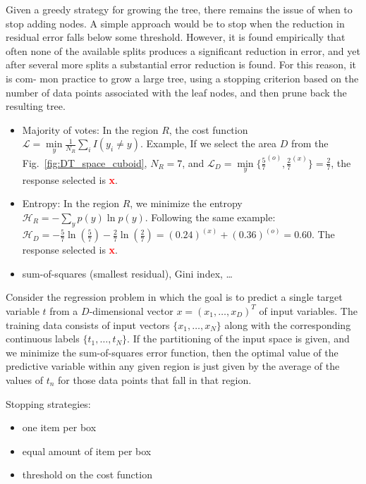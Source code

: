 \documentclass[final, paper=letter,5p,times,twocolumn]{elsarticle}
\begin{document}
Given a greedy strategy for growing the tree, there remains the issue of when to stop adding nodes. A simple approach would be to stop when the reduction in residual error falls below some threshold. However, it is found empirically that often none of the available splits produces a significant reduction in error, and yet after several more splits a substantial error reduction is found. For this reason, it is com- mon practice to grow a large tree, using a stopping criterion based on the number of data points associated with the leaf nodes, and then prune back the resulting tree.


\begin{itemize}
\item Majority of votes: In the region $R$, the cost function $\mathcal{L} = \underset{y}{\min} \frac{1}{N_{R}}\sum_{i} I(y_{i} \ne y)$. Example, If we select the area $D$ from the Fig.~\ref{fig:DT_space_cuboid}, $N_{R} = 7$, and $\mathcal{L}_{D} = \underset{y}{\min} \{ \frac{5}{7}^{(o)}, \frac{2}{7}^{(x)}\} = \frac{2}{7}$, the response selected is {\bf\textcolor{red}{x}}.
\item Entropy: In the region $R$, we minimize the entropy $\mathcal{H}_{R} = - \sum_{y} p(y)\ln p(y)$. Following the same example: $\mathcal{H}_{D} = -\frac{5}{7}\ln(\frac{5}{7}) - \frac{2}{7}\ln(\frac{2}{7}) = (0.24)^{(x)} + (0.36)^{(o)} = 0.60$. The response selected is {\bf\textcolor{red}{x}}.
  \item sum-of-squares (smallest residual), Gini index, \dots
\end{itemize}

Consider the regression problem in which the goal is to predict a single target variable $t$ from a $D$-dimensional vector $x = (x_{1}, \dots , x_{D})^{T}$ of input variables. The training data consists of input vectors $\{x_{1} , \dots , x_{N} \}$ along with the corresponding continuous labels $\{t_{1} , \dots , t_{N} \}$. If the partitioning of the input space is given, and we minimize the sum-of-squares error function, then the optimal value of the predictive variable within any given region is just given by the average of the values of $t_{n}$ for  those data points that fall in that region.


Stopping strategies:
\begin{itemize}
\item one item per box
\item equal amount of item per box
\item threshold on the cost function
\end{itemize}
\end{document}
